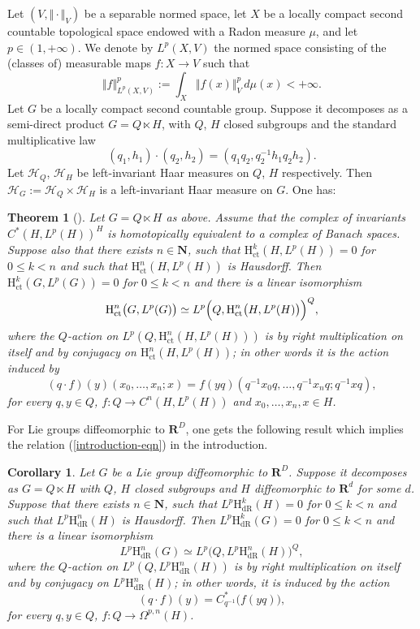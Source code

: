 \documentclass[JEP,XML,SOM,Unicode,published]{cedram}
\newcommand{\ct}{\mathrm{ct}}
\newcommand{\dR}{\mathrm{dR}}
\newcommand{\rH}{\mathrm{H}}
\newcommand{\NN}{\mathbf{N}}
\newcommand{\RR}{\mathbf{R}}
\theoremstyle{plain}
\newtheorem{theorem}[equation]{Theorem}
\newtheorem{corollary}[equation]{Corollary}
\theoremstyle{remark}
\theoremstyle{definition}
\begin{document}
Let $(V, \Vert {\cdot} \Vert_V)$ be a separable normed space, let $X$ be a locally compact second countable topological space
endowed with a Radon measure $\mu$,
and let $p \in (1, +\infty)$.
We denote by $L^p(X,V)$ the normed space consisting of the (classes of) measurable maps
$f: X \to V$ such that
\[\Vert f \Vert_{L^p(X,V)}^p:= \int_X \bigl\Vert f(x) \bigr\Vert_V^p \,d\mu (x)< +\infty.\]
Let $G$ be a locally compact second countable group. Suppose it decomposes as a semi-direct product
$G = Q \ltimes H$, with $Q$, $H$ closed subgroups and the standard multiplicative law
\[(q_1, h_1)\cdot(q_2,h_2) = (q_1q_2, q_2^{-1}h_1q_2h_2).\]
Let $\mathcal H_Q$, $\mathcal H_H$ be left-invariant Haar measures on $Q$, $H$
respectively. Then $\mathcal H_G:= \mathcal H_Q \times \mathcal H_H$ is a left-invariant Haar measure on $G$.
One has:

\begin{theorem}[{\cite[Cor.\,5.5]{BR}}]
\label{coho-theorem4}
Let $G = Q \ltimes H$ as above.
Assume that the complex of invariants $C^*(H, L^p(H))^H$ is
homotopically equivalent to a complex of \hbox{Banach} spaces. Suppose also
that there exists $n \in {\NN}$, such that $\rH_\ct^k(H, L^p(H)) = 0$ for \hbox{$0 \leqslant k < n$} and such that
$\rH_\ct^n(H, L^p(H))$ is Hausdorff.
Then $\rH_\ct^k(G, L^p(G)) = 0$ for $0 \leqslant k < n$ and there is a linear isomorphism
\begin{equation}\label{coho-semidirect}
\rH_\ct^n \bigl(G, L^p(G)\bigr) \simeq L^p\Bigl(Q, \rH_\ct^n \bigl(H, L^p(H)\bigr)\Bigr)^Q,
\end{equation}
where the $Q$-action on $L^p(Q, \rH_\ct^n(H, L^p(H)))$ is by right multiplication on itself
and by conjugacy on $\rH_\ct^n(H, L^p(H))$;
in other words it is the action induced by
\[(q \cdot f)(y)(x_0,\dots , x_n; x) = f(yq)(q^{-1} x_0 q, \dots , q^{-1} x_n q; q^{-1} x q),\]
for every $q, y \in Q$, $f: Q \to C^n(H, L^p(H))$ and $x_0,\dots ,x_n, x \in H$.
\end{theorem}

For Lie groups diffeomorphic to $\RR^D$, one gets the following result which implies the relation
(\ref{introduction-eqn}) in the introduction.

\begin{corollary}
\label{coho-corollary}
Let $G$ be a Lie group diffeomorphic to $\RR^D$.
Suppose it decomposes as $G = Q \ltimes H$ with $Q$, $H$ closed subgroups and $H$ diffeomorphic to $\RR^d$ for some $d$.
Suppose that there exists $n \in {\NN}$, such that $L^p\rH_\dR^k(H) = 0$ for $0 \leqslant k < n$ and such that
$L^p \rH_\dR^n(H)$ is Hausdorff.
Then $L^p\rH_\dR^k(G) = 0$ for $0 \leqslant k < n$ and there is a linear isomorphism
\begin{equation}
\label{coho-semidirect2}
L^p\rH_\dR^n(G) \simeq L^p\bigl(Q, L^p\rH_\dR^n(H)\bigr)^Q,
\end{equation}
where the $Q$-action on $L^p(Q, L^p\rH_\dR^n(H))$ is by right multiplication on itself and by conjugacy on $L^p\rH_\dR^n(H)$;
in other words, it is induced by the action
\[(q \cdot f)(y) = C^*_{q^{-1}} \bigl(f(yq)\bigr),\]
for every $q, y \in Q$, $f: Q \to \Omega^{p,n}(H)$.
\end{corollary}
\end{document}
